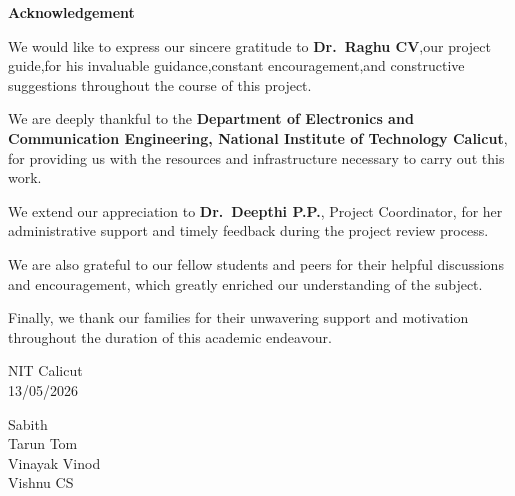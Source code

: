 \begin{center}
    \Large \textbf{Acknowledgement}
\end{center}

\vspace{0.8cm}


\justify
We would like to express our sincere gratitude to \textbf{Dr.\ Raghu CV},our project guide,for his invaluable guidance,constant encouragement,and constructive suggestions throughout the course of this project.

\justify
We are deeply thankful to the \textbf{Department of Electronics and Communication Engineering, National Institute of Technology Calicut}, for providing us with the resources and infrastructure necessary to carry out this work.

\justify
We extend our appreciation to \textbf{Dr.\ Deepthi P.P.}, Project Coordinator, for
her administrative support and timely feedback during the project review process.

\justify
We are also grateful to our fellow students and peers for their helpful discussions
and encouragement, which greatly enriched our understanding of the subject.

\justify
Finally, we thank our families for their unwavering support and motivation throughout
the duration of this academic endeavour.

\vspace{1.5cm}

\noindent
\begin{minipage}[t]{0.45\textwidth}
    NIT Calicut\\
    13/05/2026
\end{minipage}
\hfill
\begin{minipage}[t]{0.45\textwidth}
    \raggedleft
    Sabith\\
    Tarun Tom\\
    Vinayak Vinod\\
    Vishnu CS
\end{minipage}
